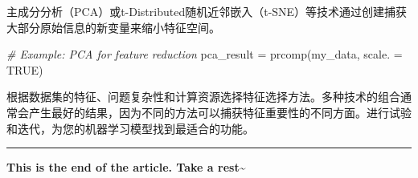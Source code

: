 \documentclass[
]{article}
\newenvironment{Shaded}{}{}
\newcommand{\AttributeTok}[1]{\textcolor[rgb]{0.49,0.56,0.16}{#1}}
\newcommand{\CommentTok}[1]{\textcolor[rgb]{0.38,0.63,0.69}{\textit{#1}}}
\newcommand{\ConstantTok}[1]{\textcolor[rgb]{0.53,0.00,0.00}{#1}}
\newcommand{\FunctionTok}[1]{\textcolor[rgb]{0.02,0.16,0.49}{#1}}
\newcommand{\NormalTok}[1]{#1}
\newcommand{\OtherTok}[1]{\textcolor[rgb]{0.00,0.44,0.13}{#1}}
\begin{document}
主成分分析（PCA）或t-Distributed随机近邻嵌入（t-SNE）等技术通过创建捕获大部分原始信息的新变量来缩小特征空间。

\begin{Shaded}
\begin{Highlighting}[]
\CommentTok{\# Example: PCA for feature reduction}
\NormalTok{pca\_result }\OtherTok{=} \FunctionTok{prcomp}\NormalTok{(my\_data, }\AttributeTok{scale. =} \ConstantTok{TRUE}\NormalTok{)}
\end{Highlighting}
\end{Shaded}

根据数据集的特征、问题复杂性和计算资源选择特征选择方法。多种技术的组合通常会产生最好的结果，因为不同的方法可以捕获特征重要性的不同方面。进行试验和迭代，为您的机器学习模型找到最适合的功能。

\begin{center}\rule{0.5\linewidth}{0.5pt}\end{center}

\textbf{This is the end of the article. Take a rest\textasciitilde{}}
\end{document}
